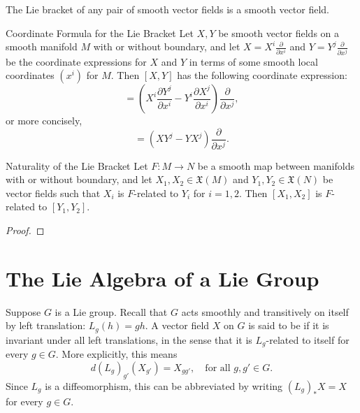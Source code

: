 \documentclass[../main.tex]{subfiles}
\begin{document}
\begin{remark}
    The Lie bracket of any pair of smooth vector fields is a smooth vector field.
\end{remark}
\begin{proposition}{Coordinate Formula for the Lie Bracket}{}
Let $X,Y$ be smooth vector fields on a smooth manifold $M$ with or without boundary, and let $X=X^{i}\frac{\partial}{\partial x^{i}}$ and $Y=Y^{j}\frac{\partial}{\partial x^{j}}$ be the coordinate expressions for $X$ and $Y$ in terms of some smooth local coordinates $(x^{i})$ for $M$. Then $[X,Y]$ has the following coordinate expression:
\begin{equation}
[X,Y]=\left(X^{i}\frac{\partial Y^{j}}{\partial x^{i}}-Y^{i}\frac{\partial X^{j}}{\partial x^{i}}\right)\frac{\partial}{\partial x^{j}},
\end{equation}
or more concisely,
\begin{equation}
[X,Y]=\left(XY^{j}-YX^{j}\right)\frac{\partial}{\partial x^{j}}.
\end{equation}
\end{proposition}
\begin{proposition}{Naturality of the Lie Bracket}{}
Let $F:M\to N$ be a smooth map between manifolds with or without boundary, and let $X_1,X_2\in\mathfrak{X}(M)$ and $Y_1,Y_2\in\mathfrak{X}(N)$ be vector fields such that $X_i$ is $F$-related to $Y_i$ for $i=1,2$. Then $[X_1,X_2]$ is $F$-related to $[Y_1,Y_2]$.
\end{proposition}

\begin{proof}
    
\end{proof}
\section{The Lie Algebra of a Lie Group}

\begin{definition}{}{}
    Suppose \(G\) is a Lie group. Recall that \(G\) acts smoothly and transitively on itself by left translation: \(L_{g}(h)=gh\). A vector field \(X\) on \(G\) is said to be  if it is invariant under all left translations, in the sense that it is \(L_{g}\)-related to itself for every \(g\in G\). More explicitly, this means
\[
d(L_{g})_{g'}(X_{g'})=X_{gg'},\quad\text{for all }g,g'\in G.
\]
Since \(L_{g}\) is a diffeomorphism, this can be abbreviated by writing \((L_{g})_{*}X=X\) for every \(g\in G\).
\end{definition}
\end{document}
